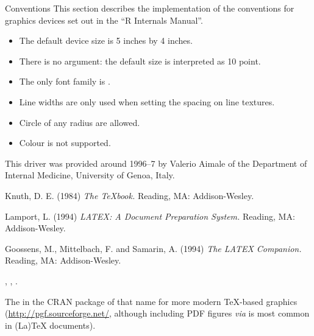 %
\begin{Section}{Conventions}
This section describes the implementation of the conventions for
graphics devices set out in the ``R Internals Manual''.

\begin{itemize}

\item The default device size is 5 inches by 4 inches.
\item There is no  argument: the default size is
interpreted as 10 point.
\item The only font family is .
\item Line widths are only used when setting the spacing on line textures.
\item Circle of any radius are allowed.
\item Colour is not supported.

\end{itemize}

\end{Section}
%
\begin{Author}\relax
This driver was provided around 1996--7 by Valerio Aimale
of the Department of Internal Medicine, University of Genoa, Italy.
\end{Author}
%
\begin{References}\relax
Knuth, D. E. (1984)
\emph{The TeXbook.}
Reading, MA: Addison-Wesley.

Lamport, L. (1994)
\emph{LATEX: A Document Preparation System.}
Reading, MA: Addison-Wesley.

Goossens, M., Mittelbach, F. and Samarin, A. (1994)
\emph{The LATEX Companion.}
Reading, MA: Addison-Wesley.
\end{References}
%
\begin{SeeAlso}\relax
{}, , .

The  in the CRAN package of that name for more modern
TeX-based graphics (\url{http://pgf.sourceforge.net/}, although
including PDF figures \emph{via}  is most common
in (La)TeX documents).
\end{SeeAlso}
%
\begin{Examples}
\end{Examples}
